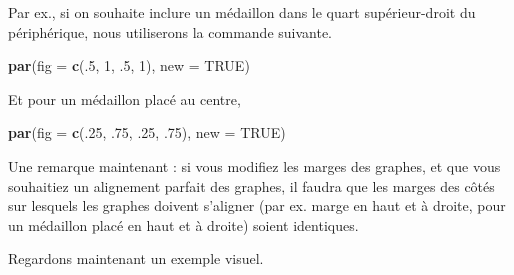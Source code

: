 \documentclass[]{article}
\newenvironment{Shaded}{\begin{snugshade}}{\end{snugshade}}
\newcommand{\DataTypeTok}[1]{\textcolor[rgb]{0.13,0.29,0.53}{#1}}
\newcommand{\DecValTok}[1]{\textcolor[rgb]{0.00,0.00,0.81}{#1}}
\newcommand{\FloatTok}[1]{\textcolor[rgb]{0.00,0.00,0.81}{#1}}
\newcommand{\KeywordTok}[1]{\textcolor[rgb]{0.13,0.29,0.53}{\textbf{#1}}}
\newcommand{\NormalTok}[1]{#1}
\newcommand{\OtherTok}[1]{\textcolor[rgb]{0.56,0.35,0.01}{#1}}
\begin{document}
Par ex., si on souhaite inclure un médaillon dans le quart supérieur-droit du périphérique, nous utiliserons la commande suivante.

\begin{Shaded}
\begin{Highlighting}[]
\KeywordTok{par}\NormalTok{(}\DataTypeTok{fig =} \KeywordTok{c}\NormalTok{(.}\DecValTok{5}\NormalTok{, }\DecValTok{1}\NormalTok{, }\FloatTok{.5}\NormalTok{, }\DecValTok{1}\NormalTok{), }\DataTypeTok{new =} \OtherTok{TRUE}\NormalTok{)}
\end{Highlighting}
\end{Shaded}

Et pour un médaillon placé au centre,

\begin{Shaded}
\begin{Highlighting}[]
\KeywordTok{par}\NormalTok{(}\DataTypeTok{fig =} \KeywordTok{c}\NormalTok{(.}\DecValTok{25}\NormalTok{, }\FloatTok{.75}\NormalTok{, }\FloatTok{.25}\NormalTok{, }\FloatTok{.75}\NormalTok{), }\DataTypeTok{new =} \OtherTok{TRUE}\NormalTok{)}
\end{Highlighting}
\end{Shaded}

Une remarque maintenant : si vous modifiez les marges des graphes, et que vous souhaitiez un alignement parfait des graphes, il faudra que les marges des côtés sur lesquels les graphes doivent s'aligner (par ex. marge en haut et à droite, pour un médaillon placé en haut et à droite) soient identiques.

Regardons maintenant un exemple visuel.
\end{document}

